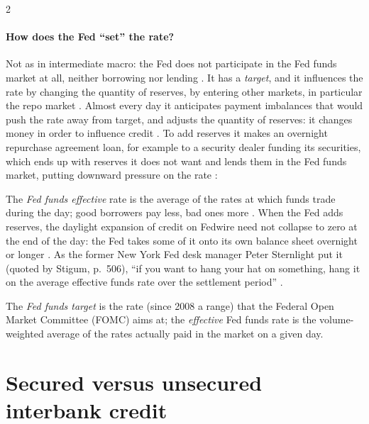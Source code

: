 \begin{paracol}{2}
\paragraph{How does the Fed ``set'' the rate?} Not as in intermediate macro: the Fed does not participate in the Fed funds market at all, neither borrowing nor
lending . It has a \emph{target}, and it influences the rate by changing the quantity of reserves, by entering other markets, in particular the
repo market . Almost every day it anticipates payment imbalances that would push the rate away from target, and adjusts the quantity of reserves: it
changes money in order to influence credit . To add reserves it makes an overnight repurchase agreement loan, for example to a
security dealer funding its securities, which ends up with reserves it does not want and lends them in the Fed funds market, putting downward pressure on the rate
:
\begin{taccts}
\quad
{}
\end{taccts}
The \emph{Fed funds effective} rate is the average of the rates at which funds trade during the day; good borrowers pay less, bad ones more .
When the Fed adds reserves, the daylight expansion of credit on Fedwire need not collapse to zero at the end of the day: the Fed takes some of it onto its own
balance sheet overnight or longer . As the former New York Fed desk manager Peter Sternlight put it (quoted by Stigum, p.~506), ``if you want to hang your
hat on something, hang it on the average effective funds rate over the settlement period'' .

\begin{definition}
The \emph{Fed funds target} is the rate (since 2008 a range) that the Federal Open Market Committee (FOMC) aims at; the \emph{effective} Fed funds rate is the
volume-weighted average of the rates actually paid in the market on a given day.
\end{definition}

\section{Secured versus unsecured interbank credit}\label{sec:ff-unsecured}


\end{paracol}
